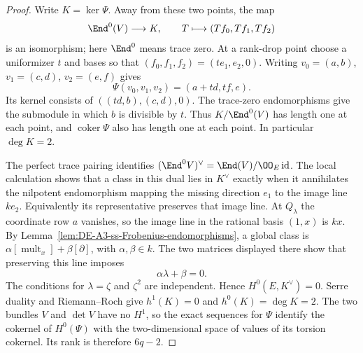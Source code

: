 \begin{proof}
Write $K=\ker\Psi$.  Away from these two points, the map
\[
             \End^0(V)\longrightarrow K,\qquad
                    T\longmapsto(Tf_0,Tf_1,Tf_2)
\]
is an isomorphism; here $\End^0$ means trace zero.  At a rank-drop
point choose a uniformizer $t$ and bases so that
$(f_0,f_1,f_2)=(t e_1,e_2,0)$.
Writing $v_0=(a,b)$, $v_1=(c,d)$, $v_2=(e,f)$ gives
\[
                    \Psi(v_0,v_1,v_2)=(a+td,tf,e).
\]
Its kernel consists of $((td,b),(c,d),0)$.
The trace-zero endomorphisms give the submodule in which $b$ is
divisible by $t$.  Thus $K/\End^0(V)$ has length one at each point,
and $\operatorname{coker}\Psi$ also has length one at each point.
In particular $\deg K=2$.

The perfect trace pairing identifies
$(\End^0 V)^\vee=\End(V)/\OO_E\operatorname{id}$.
The local calculation shows that a class in this dual lies in $K^\vee$
exactly when it annihilates the nilpotent endomorphism mapping the
missing direction $e_1$ to the image line $k e_2$.  Equivalently its
representative preserves that image line.  At $Q_\lambda$ the coordinate
row $a$ vanishes, so the image line in the rational basis $(1,x)$ is
$k x$.  By Lemma~\ref{lem:DE-A3-ss-Frobenius-endomorphisms}, a global
class is $\alpha[\operatorname{mult}_x]+\beta[\partial]$, with
$\alpha,\beta\in k$.  The two matrices displayed there show that
preserving this line imposes
\[
                         \alpha\lambda+\beta=0.
\]
The conditions for $\lambda=\zeta$ and $\zeta^2$ are independent.
Hence $H^0(E,K^\vee)=0$.  Serre duality and Riemann--Roch give
$h^1(K)=0$ and $h^0(K)=\deg K=2$.
The two bundles $V$ and $\det V$ have no $H^1$, so the exact sequences
for $\Psi$ identify the cokernel of $H^0(\Psi)$ with the two-dimensional
space of values of its torsion cokernel.  Its rank is therefore $6q-2$.


\end{proof}
